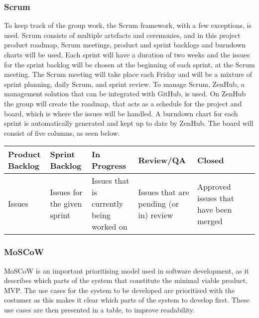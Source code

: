 \subsubsection{Scrum}
To keep track of the group work, the Scrum framework, with a few exceptions, is
used. Scrum consists of multiple artefacts and ceremonies, and in this project
product roadmap, Scrum meetings, product and sprint backlogs and burndown charts
will be used. Each sprint will have a duration of two weeks and the issues for
the sprint backlog will be chosen at the beginning of each sprint, at the Scrum
meeting. The Scrum meeting will take place each Friday and will be a mixture of
sprint planning, daily Scrum, and sprint review. To manage Scrum, ZenHub, a
management solution that can be integrated with GitHub, is used. On ZenHub the
group will create the roadmap, that acts as a schedule for the project and
board, which is where the issues will be handled. A burndown chart for each
sprint is automatically generated and kept up to date by ZenHub. The board will
consist of five columns, as seen below.

\begin{table}[H]
    \begin{tabularx}{\textwidth}{|>{\RaggedRight}X|>{\RaggedRight}X|>{\RaggedRight}X|>{\RaggedRight}X|>{\RaggedRight}X|>{\RaggedRight}X|>{\RaggedRight}X|}
        \hline                             
        \textbf{Product Backlog} & \textbf{Sprint Backlog} & \textbf{In Progress} & \textbf{Review/QA} & \textbf{Closed} \\
        \hline
        Issues & Issues for the given sprint & Issues that is currently being worked on & Issues that are pending (or in) review & Approved issues that have been merged    \\
        \hline
    \end{tabularx}
    \label{table:scrum}
\end{table} 

\subsubsection{MoSCoW}
MoSCoW is an important prioritising model used in software development, as it
describes which parts of the system that constitute the minimal viable product,
MVP. The use cases for the system to be developed are prioritised with the
costumer as this makes it clear which parts of the system to develop first.
These use cases are then presented in a table, to improve readability.\\


